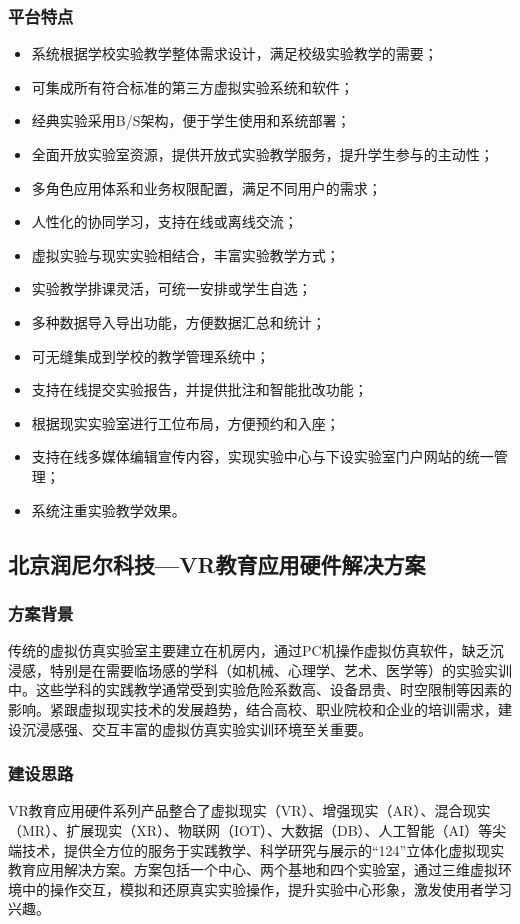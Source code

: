 \subsubsection{平台特点}
\begin{itemize}
    \item 系统根据学校实验教学整体需求设计，满足校级实验教学的需要；
    \item 可集成所有符合标准的第三方虚拟实验系统和软件；
    \item 经典实验采用B/S架构，便于学生使用和系统部署；
    \item 全面开放实验室资源，提供开放式实验教学服务，提升学生参与的主动性；
    \item 多角色应用体系和业务权限配置，满足不同用户的需求；
    \item 人性化的协同学习，支持在线或离线交流；
    \item 虚拟实验与现实实验相结合，丰富实验教学方式；
    \item 实验教学排课灵活，可统一安排或学生自选；
    \item 多种数据导入导出功能，方便数据汇总和统计；
    \item 可无缝集成到学校的教学管理系统中；
    \item 支持在线提交实验报告，并提供批注和智能批改功能；
    \item 根据现实实验室进行工位布局，方便预约和入座；
    \item 支持在线多媒体编辑宣传内容，实现实验中心与下设实验室门户网站的统一管理；
    \item 系统注重实验教学效果。
\end{itemize}

\subsection{北京润尼尔科技---VR教育应用硬件解决方案}

\subsubsection{方案背景}
传统的虚拟仿真实验室主要建立在机房内，通过PC机操作虚拟仿真软件，缺乏沉浸感，特别是在需要临场感的学科（如机械、心理学、艺术、医学等）的实验实训中。这些学科的实践教学通常受到实验危险系数高、设备昂贵、时空限制等因素的影响。紧跟虚拟现实技术的发展趋势，结合高校、职业院校和企业的培训需求，建设沉浸感强、交互丰富的虚拟仿真实验实训环境至关重要。

\subsubsection{建设思路}
VR教育应用硬件系列产品整合了虚拟现实（VR）、增强现实（AR）、混合现实（MR）、扩展现实（XR）、物联网（IOT）、大数据（DB）、人工智能（AI）等尖端技术，提供全方位的服务于实践教学、科学研究与展示的“124”立体化虚拟现实教育应用解决方案。方案包括一个中心、两个基地和四个实验室，通过三维虚拟环境中的操作交互，模拟和还原真实实验操作，提升实验中心形象，激发使用者学习兴趣。

